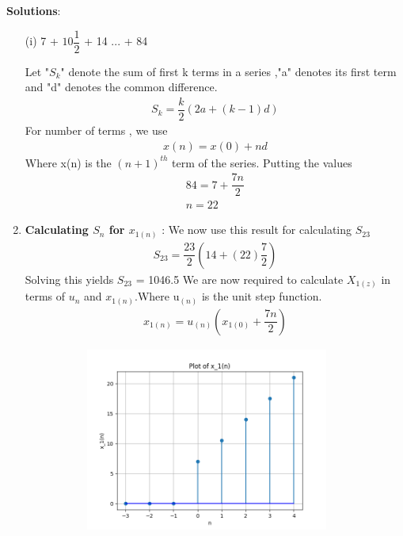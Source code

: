 \documentclass[journal,12pt,twocolumn]{IEEEtran}
\theoremstyle{remark}
\begin{document}
\vspace{0.5cm}
\textbf{Solutions}:
\begin{enumerate}
\item[(i)]   
7 + $10\dfrac{1}{2}$ + 14 ... + 84\vspace{0.05cm}
\vspace{0.2cm}

Let "$S_{k}$" denote the sum of first k terms in a series ,"a" denotes its first term and "d" denotes the common difference.
\begin{align}
{S_k} = \dfrac{k}{2}(2a + (k-1)d)\label{eq:1}
\end{align}
For number of terms , we use
\begin{align}
x(n) = x(0) + nd\label{eq:2}
\end{align}
Where x(n) is the $(n+1)^{th}$ term of the series. Putting the values
\begin{align}  
84 = 7+\dfrac{7n}{2}\\
n=22
\end{align}
\item 
\textbf{Calculating $S_n$ for $x_{1(n)}$} : 
We now use this result for calculating $S_{23}$
\begin{align}
    S_{23} = \dfrac{23}{2}(14+(22)\dfrac{7}{2})
    \end{align}
Solving this yields $S_{23}$ = 1046.5\vspace{0.05cm}\vspace{0.05cm}
We are now required to calculate $X_{1(z)}$ in terms of $u_n$ and $x_{1(n)}$.Where u$_{(n)}$ is the unit step function.
\begin{align}
    x_{1(n)} = u_{(n)}(x_{1(0)}+\dfrac{7n}{2})
    \end{align}
    \begin{figure}[!ht]
    \centering
\graphicspath{ {figs/} }
\includegraphics[width=10cm, height=6cm]{graph_1}
\end{figure}

\end{enumerate}
\end{document}
